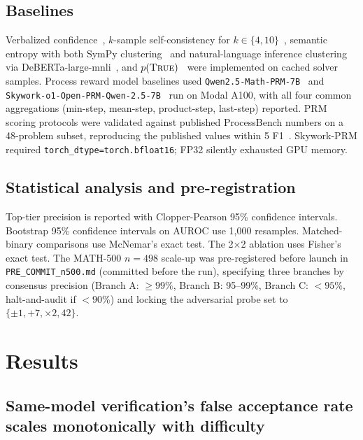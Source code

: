 \documentclass{article}
\begin{document}
\subsection{Baselines}

Verbalized confidence~\citep{xiong2024llmuncertainty}, $k$-sample self-consistency for $k\in\{4,10\}$~\citep{wang2023selfconsistency}, semantic entropy with both SymPy clustering~\citep{kuhn2023semantic} and natural-language inference clustering via DeBERTa-large-mnli~\citep{farquhar2024nature}, and $p(\textsc{True})$~\citep{kadavath2022} were implemented on cached solver samples. Process reward model baselines used \texttt{Qwen2.5-Math-PRM-7B}~\citep{qwenprm2025} and \texttt{Skywork-o1-Open-PRM-Qwen-2.5-7B}~\citep{skyworkprm2024} run on Modal A100, with all four common aggregations (min-step, mean-step, product-step, last-step) reported. PRM scoring protocols were validated against published ProcessBench numbers on a 48-problem subset, reproducing the published values within 5 F1~\citep{processbench2024}. Skywork-PRM required \texttt{torch\_dtype=torch.bfloat16}; FP32 silently exhausted GPU memory.

\subsection{Statistical analysis and pre-registration}

Top-tier precision is reported with Clopper-Pearson 95\% confidence intervals. Bootstrap 95\% confidence intervals on AUROC use 1{,}000 resamples. Matched-binary comparisons use McNemar's exact test. The 2$\times$2 ablation uses Fisher's exact test. The MATH-500 $n{=}498$ scale-up was pre-registered before launch in \texttt{PRE\_COMMIT\_n500.md} (committed before the run), specifying three branches by consensus precision (Branch A: $\geq 99\%$, Branch B: 95--99\%, Branch C: $<95\%$, halt-and-audit if $<90\%$) and locking the adversarial probe set to $\{\pm 1, +7, \times 2, 42\}$.

\section{Results}
\label{sec:results}

\subsection{Same-model verification's false acceptance rate scales monotonically with difficulty}
\end{document}
